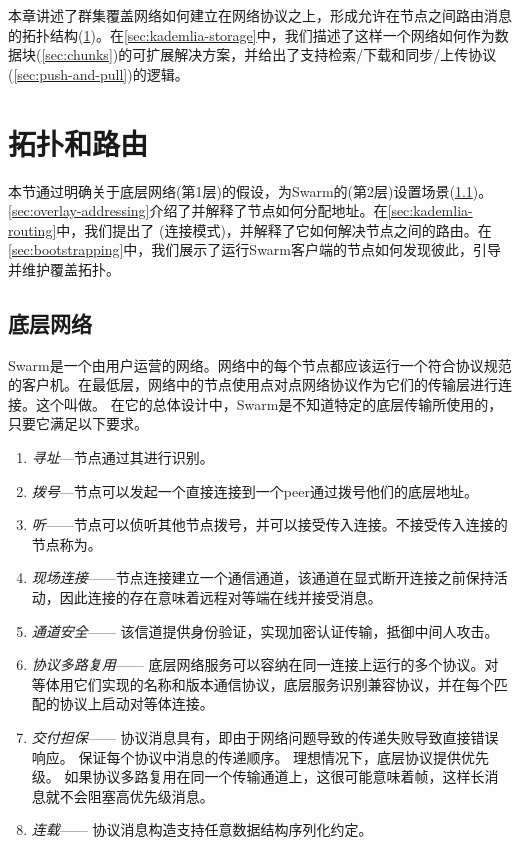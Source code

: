 本章讲述了群集覆盖网络如何建立在网络协议之上，形成允许在节点之间路由消息的拓扑结构(\ref{sec:topology-routing})。在\ref{sec:kademlia-storage}中，我们描述了这样一个网络如何作为数据块(\ref{sec:chunks})的可扩展解决方案，并给出了支持检索/下载和同步/上传协议(\ref{sec:push-and-pull})的逻辑。

\section{拓扑和路由\statusgreen}\label{sec:topology-routing}

本节通过明确关于底层网络(第1层)的假设，为Swarm的(第2层)设置场景(\ref{sec:underlay-transport})。\ref{sec:overlay-addressing}介绍了并解释了节点如何分配地址。在\ref{sec:kademlia-routing}中，我们提出了 (连接模式)，并解释了它如何解决节点之间的路由。在\ref{sec:bootstrapping}中，我们展示了运行Swarm客户端的节点如何发现彼此，引导并维护覆盖拓扑。

\subsection{底层网络}\label{sec:underlay-transport} 

\yellow{}

Swarm是一个由用户运营的网络。网络中的每个节点都应该运行一个符合协议规范的客户机。在最低层，网络中的节点使用点对点网络协议作为它们的传输层进行连接。这个叫做。 
在它的总体设计中，Swarm是不知道特定的底层传输所使用的，只要它满足以下要求。

\begin{enumerate}
    \item \emph{寻址}—节点通过其进行识别。
    \item \emph{拨号}—节点可以发起一个直接连接到一个peer通过拨号他们的底层地址。
    \item \emph{听}——节点可以侦听其他节点拨号，并可以接受传入连接。不接受传入连接的节点称为。
    \item \emph{现场连接}——节点连接建立一个通信通道，该通道在显式断开连接之前保持活动，因此连接的存在意味着远程对等端在线并接受消息。
    \item \emph{通道安全}—— 
    该信道提供身份验证，实现加密认证传输，抵御中间人攻击。
    \item \emph{协议多路复用}—— 
    底层网络服务可以容纳在同一连接上运行的多个协议。对等体用它们实现的名称和版本通信协议，底层服务识别兼容协议，并在每个匹配的协议上启动对等体连接。 
    \item \emph{交付担保}—— 
    协议消息具有，即由于网络问题导致的传递失败导致直接错误响应。 
    保证每个协议中消息的传递顺序。 
    理想情况下，底层协议提供优先级。 
    如果协议多路复用在同一个传输通道上，这很可能意味着帧，这样长消息就不会阻塞高优先级消息。
    \item \emph{连载}—— 
    协议消息构造支持任意数据结构序列化约定。
    
\end{enumerate}

